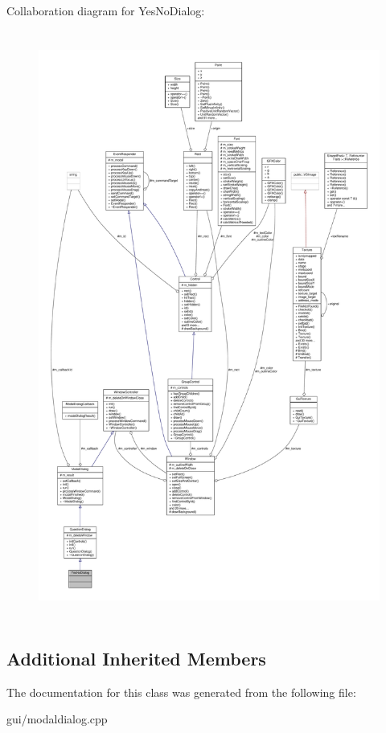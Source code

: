 Collaboration diagram for Yes\+No\+Dialog\+:
\nopagebreak
\begin{figure}[H]
\begin{center}
\leavevmode
\includegraphics[height=550pt]{d0/d72/classYesNoDialog__coll__graph}
\end{center}
\end{figure}
\subsection*{Additional Inherited Members}


The documentation for this class was generated from the following file\+:\begin{DoxyCompactItemize}
\item 
gui/modaldialog.\+cpp\end{DoxyCompactItemize}

